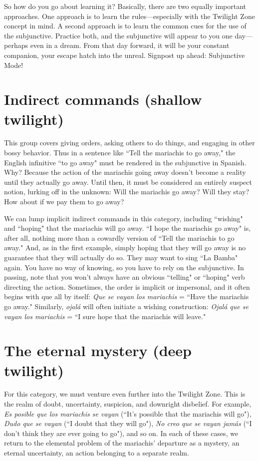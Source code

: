 So how do you go about learning it? Basically, there are two
equally important approaches. One approach is to learn the
rules---especially with the Twilight Zone concept in mind. A second
approach is to learn the common cues for the use of the subjunctive.
Practice both, and the subjunctive will appear to you one day---perhaps
even in a dream. From that day forward, it will be your constant companion, your escape hatch into the unreal. Signpost up ahead: Subjunctive Mode!

\section{Indirect commands (shallow twilight)}

This group covers giving orders, asking others to do things,
and engaging in other bossy behavior. Thus in a sentence like ``Tell the
mariachis to go away," the English infinitive ``to go away" must be rendered in the subjunctive in Spanish. Why? Because the action of the
mariachis going away doesn't become a reality until they actually go
away. Until then, it must be considered an entirely suspect notion,
lurking off in the unknown: Will the mariachis go away? Will they
stay? How about if we pay them to go away?

We can lump implicit indirect commands in this category, including ``wishing" and ``hoping" that the mariachis will go away. ``I
hope the mariachis go away" is, after all, nothing more than a cowardly version of ``Tell the mariachis to go away." And, as in the first
example, simply hoping that they will go away is no guarantee that
they will actually do so. They may want to sing ``La Bamba" again.
You have no way of knowing, so you have to rely on the subjunctive. In
passing, note that you won't always have an obvious ``telling" or ``hoping" verb directing the action. Sometimes, the order is implicit or impersonal, and it often begins with que all by itself: \emph{Que se vayan los
	mariachis} = ``Have the mariachis go away." Similarly, \emph{ojalá} will often
initiate a wishing construction: \emph{Ojalá que se vayan los mariachis} =
``I sure hope that the mariachis will leave."

\section{The eternal mystery (deep twilight)}

For this category, we must venture even further into the Twilight Zone. This is the realm of doubt, uncertainty, suspicion, and
downright disbelief. For example, \emph{Es posible que los mariachis se
	vayan} (``It's possible that the mariachis will go"), \emph{Dudo que se vayan}
(``I doubt that they will go"), \emph{No creo que se vayan jamás} (``I don't
think they are ever going to go"), and so on. In each of these cases, we
return to the elemental problem of the mariachis' departure as a mystery, an eternal uncertainty, an action belonging to a separate realm.

